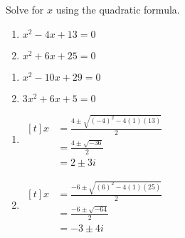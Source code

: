 \documentclass[11pt,a4paper]{book}
\begin{document}
\begin{example}

Solve for $x$ using the quadratic formula.

\begin{minipage}[t]{0.5\textwidth}

\begin{enumerate}[label=(\alph*)]

\item  $x^{2}-4x+13=0$

\addtocounter{enumi}{1}

\item  $x^{2}+6x+25=0$

\end{enumerate}

\end{minipage}
\begin{minipage}[t]{0.5\textwidth}

\begin{enumerate}[label=(\alph*),start=2]

\item  $x^{2}-10x+29=0$

\addtocounter{enumi}{1}

\item  $3x^{2}+6x+5=0$

\end{enumerate}

\end{minipage}

\medskip{}

\Solution

\begin{minipage}[t]{0.5\textwidth}

\begin{enumerate}[label=(\alph*)]

\item
$
\begin{aligned}[t]
x & =\frac{4\pm\sqrt{\left(-4\right)^{2}-4\left(1\right)\left(13\right)}}{2}\\
 & =\frac{4\pm\sqrt{-36}}{2}\\
 & =2\pm3i
\end{aligned}
$

\addtocounter{enumi}{1}

\item
$
\begin{aligned}[t]
x & =\frac{-6\pm\sqrt{\left(6\right)^{2}-4\left(1\right)\left(25\right)}}{2}\\
 & =\frac{-6\pm\sqrt{-64}}{2}\\
 & =-3\pm4i
\end{aligned}
$


\end{enumerate}
\end{minipage}
\end{example}
\end{document}
